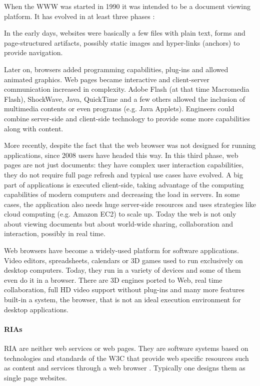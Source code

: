 When the \ac{WWW} was started in 1990 it was intended to be a document viewing platform.
It has evolved in at least three phases \cite{Anttonen:2011} \cite{Taivalsaari:2008}:

In the early days, websites were basically a few files with plain text, forms and page-structured artifacts, possibly static images and hyper-links (anchors) to provide navigation. 

Later on, browsers added programming capabilities, plug-ins and allowed animated graphics. 
Web pages became interactive and client-server communication increased in complexity.
Adobe Flash (at that time Macromedia Flash), ShockWave, Java, QuickTime and a few others allowed the inclusion of multimedia contents or even programs (e.g. Java Applets).
Engineers could combine server-side and client-side technology to provide some more capabilities along with content.

More recently, despite the fact that the web browser was not designed for running applications, since 2008 users have headed this way. 
In this third phase, web pages are not just documents: they have complex user interaction capabilities, they do not require full page refresh and typical use cases have evolved. 
A big part of applications is executed client-side, taking advantage of the computing capabilities of modern computers and decreasing the load in servers. In some cases, the application also needs huge server-side resources and uses strategies like cloud computing (e.g. Amazon EC2) to scale up.
Today the web is not only about viewing documents but about world-wide sharing, collaboration and interaction, possibly in real time. 

Web browsers have become a widely-used platform for software applications. 
Video editors, spreadsheets, calendars or 3D games used to run exclusively on desktop computers. 
Today, they run in a variety of devices and some of them even do it in a browser. 
There are 3D engines ported to Web, real time collaboration, full HD video support without plug-ins and many more features built-in a system, the browser, that is not an ideal execution environment for desktop applications.

\paragraph{\acp{RIA}}
\acs{RIA} are neither web services or web pages. 
They are software systems based on technologies and standards of the \ac{W3C} that provide web specific resources such as content and services through a web browser \cite{Kappel:2006}.
Typically one designs them as single page websites.

